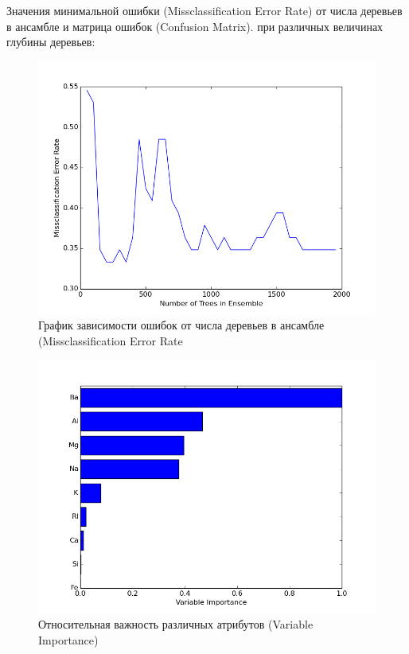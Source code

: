 \documentclass{article} %
\begin{document}
Значения минимальной ошибки (Missclassification Error Rate)
от числа деревьев в ансамбле и матрица ошибок (Confusion Matrix).
при различных величинах глубины деревьев:


\begin{figure}[H]
    \centering
    \includegraphics[width=\textwidth]{mer1depth}
    \caption{График зависимости ошибок от числа деревьев в ансамбле (Missclassification Error Rate}
\end{figure}

\begin{figure}[H]
    \centering
    \includegraphics[width=\textwidth]{varImp1depth.png}
    \caption{Относительная важность различных атрибутов (Variable Importance)}
\end{figure}
\end{document}
